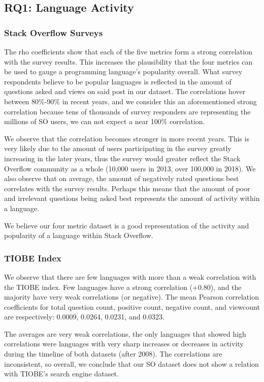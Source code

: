 \documentclass[conference]{IEEEtran}
\begin{document}
\subsection{RQ1: Language Activity}

\subsubsection{Stack Overflow Surveys}
The rho coefficients show that each of the five metrics form a strong correlation with the survey results. This increases the plausibility that the four metrics can be used to gauge a programming language's popularity overall. What survey respondents believe to be popular languages is reflected in the amount of questions asked and views on said post in our dataset. The correlations hover between 80\%-90\% in recent years, and we consider this an aforementioned strong correlation because tens of thousands of survey responders are representing the millions of SO users, we can not expect a near 100\% correlation.

We observe that the correlation becomes stronger in more recent years. This is very likely due to the amount of users participating in the survey greatly increasing in the later years, thus the survey would greater reflect the Stack Overflow community as a whole (10,000 users in 2013, over 100,000 in 2018). We also observe that on average, the amount of negatively rated questions best correlates with the survey results. Perhaps this means that the amount of poor and irrelevant questions being asked best represents the amount of activity within a language.

We believe our four metric dataset is a good representation of the activity and popularity of a language within Stack Overflow.

\subsubsection{TIOBE Index}

We observe that there are few languages with more than a weak correlation with the TIOBE index. Few languages have a strong correlation (+0.80), and the majority have very weak correlations (or negative). The mean Pearson correlation coefficients for total question count, positive count, negative count, and viewcount are respectively: 0.0009, 0.0264, 0.0231, and 0.0323.

The averages are very weak correlations, the only languages that showed high correlations were languages with very sharp increases or decreases in activity during the timeline of both datasets (after 2008). The correlations are inconsistent, so overall, we conclude that our SO dataset does not show a relation with TIOBE's search engine dataset.
\end{document}
